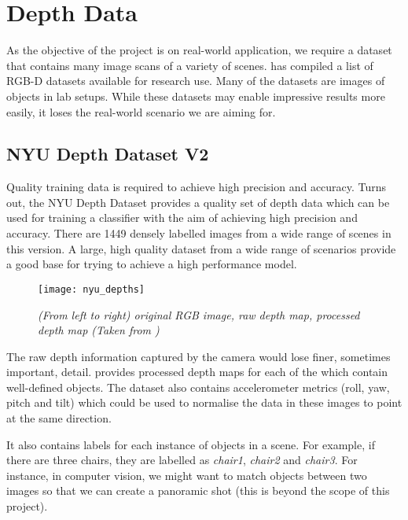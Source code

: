 \newpage
\section{Depth Data} \label{sec:lit-depth-data}
As the objective of the project is on real-world application, we require a dataset that contains many image scans of a variety of scenes.  has compiled a list of RGB-D datasets available for research use. Many of the datasets are images of objects in lab setups. While these datasets may enable impressive results more easily, it loses the real-world scenario we are aiming for.


\subsection{NYU Depth Dataset V2 \protect\cite{nyu-dataset}}
Quality training data is required to achieve high precision and accuracy. Turns out, the NYU Depth Dataset provides a quality set of depth data which can be used for training a classifier with the aim of achieving high precision and accuracy. There are 1449 densely labelled images from a wide range of scenes in this version. A large, high quality dataset from a wide range of scenarios provide a good base for trying to achieve a high performance model.

\begin{figure}[h]
  \centering
  \texttt{[image: nyu\_depths]}
  \caption{\textit{(From left to right) original RGB image, raw depth map, processed depth map (Taken from \protect{})}}
  \label{fig:nyu_depths}
\end{figure}

The raw depth information captured by the camera would lose finer, sometimes important, detail.  provides processed depth maps for each of the which contain well-defined objects. The dataset also contains accelerometer metrics (roll, yaw, pitch and tilt) which could be used to normalise the data in these images to point at the same direction.

It also contains labels for each instance of objects in a scene. For example, if there are three chairs, they are labelled as \textit{chair1}, \textit{chair2} and \textit{chair3}. For instance, in computer vision, we might want to match objects between two images so that we can create a panoramic shot (this is beyond the scope of this project).


